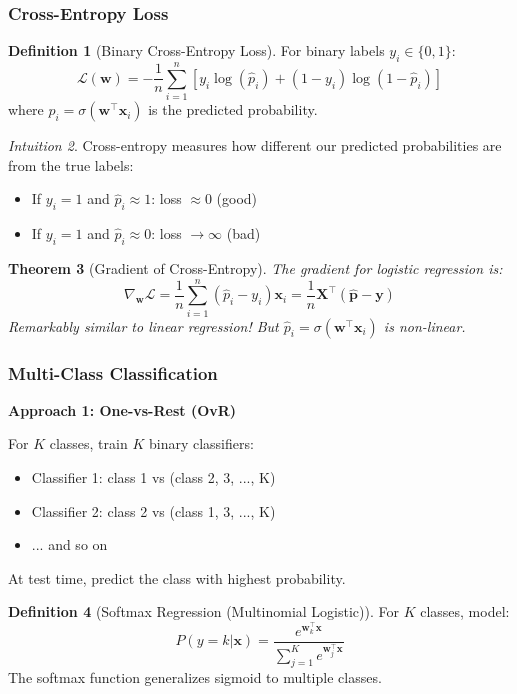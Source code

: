 \documentclass[11pt,twoside]{article}
\numberwithin{equation}{section}
\newcommand{\vect}[1]{\bm{#1}}
\newcommand{\mat}[1]{\bm{#1}}
\newcommand{\Loss}{\mathcal{L}}
\theoremstyle{plain}
\newtheorem{theorem}{Theorem}[section]
\theoremstyle{definition}
\newtheorem{definition}[theorem]{Definition}
\theoremstyle{remark}
\newtheorem{intuition}[theorem]{Intuition}
\begin{document}
\subsubsection{Cross-Entropy Loss}

\begin{definition}[Binary Cross-Entropy Loss]
For binary labels $y_i \in \{0, 1\}$:
\[
\Loss(\vect{w}) = -\frac{1}{n}\sum_{i=1}^n \left[y_i \log(\hat{p}_i) + (1-y_i)\log(1-\hat{p}_i)\right]
\]
where $\hat{p}_i = \sigma(\vect{w}^\top\vect{x}_i)$ is the predicted probability.
\end{definition}

\begin{intuition}
Cross-entropy measures how different our predicted probabilities are from the true labels:
\begin{itemize}
\item If $y_i = 1$ and $\hat{p}_i \approx 1$: loss $\approx 0$ (good)
\item If $y_i = 1$ and $\hat{p}_i \approx 0$: loss $\to \infty$ (bad)
\end{itemize}
\end{intuition}

\begin{theorem}[Gradient of Cross-Entropy]
The gradient for logistic regression is:
\[
\nabla_{\vect{w}} \Loss = \frac{1}{n}\sum_{i=1}^n (\hat{p}_i - y_i)\vect{x}_i = \frac{1}{n}\mat{X}^\top(\hat{\vect{p}} - \vect{y})
\]
Remarkably similar to linear regression! But $\hat{p}_i = \sigma(\vect{w}^\top\vect{x}_i)$ is non-linear.
\end{theorem}

\subsubsection{Multi-Class Classification}

\textbf{Approach 1: One-vs-Rest (OvR)}

For $K$ classes, train $K$ binary classifiers:
\begin{itemize}
\item Classifier 1: class 1 vs (class 2, 3, ..., K)
\item Classifier 2: class 2 vs (class 1, 3, ..., K)
\item ... and so on
\end{itemize}
At test time, predict the class with highest probability.

\begin{definition}[Softmax Regression (Multinomial Logistic)]
For $K$ classes, model:
\[
P(y = k | \vect{x}) = \frac{e^{\vect{w}_k^\top\vect{x}}}{\sum_{j=1}^K e^{\vect{w}_j^\top\vect{x}}}
\]
The softmax function generalizes sigmoid to multiple classes.
\end{definition}
\end{document}
